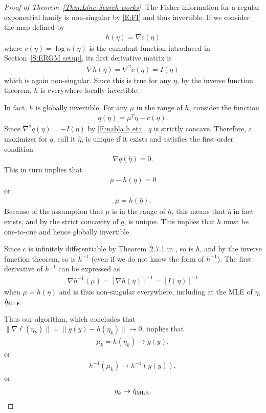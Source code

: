 \begin{proof}[Proof of Theorem~\ref{Thm:Line Search works}]

The Fisher information for a regular exponential family is non-singular by 
\eqref{E:FI} and thus invertible.  If we consider the map defined by
\begin{align*}
	h(\eta) = \nabla c(\eta)
\end{align*}
where $c(\eta) = \log \kappa(\eta)$ is the cumulant function introduced in Section~\ref{S:ERGM setup}, its first derivative matrix is
\begin{align}
	\nabla h(\eta) = \nabla^2 c(\eta) = I(\eta) \label{E:nabla h eta}
\end{align}
which is again non-singular.  Since this is true for any $\eta$, by the inverse 
function theorem, $h$ is everywhere 
locally invertible.

In fact, $h$ is globally invertible. For any $\mu$ in the range of $h$, consider the 
function
\begin{align*}
	q(\eta) = \mu^T\eta - c(\eta).
\end{align*}
Since $\nabla^2 q(\eta) = - I(\eta)$ by \eqref{E:nabla h eta}, $q$ is strictly 
concave.  Therefore, a maximizer for $q$, call it $\hat{\eta}$, is unique if it exists and satisfies the first-order condition
\begin{align*}
	\nabla q( \hat{\eta} ) = 0.
\end{align*}
This in turn implies that
\begin{align*}
	\mu - h(\hat{\eta}) = 0
\end{align*} 
or
\begin{align*}
	\mu = h( \hat{\eta} ). %
\end{align*}
Because of the assumption that $\mu$ is in the range of $h$, this means that 
$\hat{\eta}$ in fact exists, and by the 
strict concavity of $q$, is unique.  This implies that $h$ must be one-to-one and 
hence globally invertible.


Since $c$ is infinitely differentiable by Theorem~2.7.1 in \citet{TSH}, so is $h$, and 
by the inverse function theorem, 
so is $h^{-1}$ (even if we do not know the form of $h^{-1}$).  The first derivative of 
$h^{-1}$ can be expressed as
\begin{align*}
	\nabla h^{-1}(\mu) = \left [ \nabla h(\eta) \right ]^{-1} 
		= \left [ I(\eta) \right ]^{-1}
\end{align*}
when $\mu = h(\eta)$ and is thus non-singular everywhere, including at the MLE of 
$\eta$, $\hat{\eta}_{\textrm{MLE}}$.

Thus our algorithm, which concludes that 
$\lVert \nabla \ell( \eta_k) \rVert  = \lVert g(y) - h(\eta_k) \rVert \to 0$, implies that 
\begin{align*}
	\mu_k = h(\eta_k) \to g(y), 
\end{align*}
or
\begin{align*}
	h^{-1}(\mu_k)  \to h^{-1}\left (g(y) \right),
\end{align*}
or
\begin{align*}
	\eta_k  \to  \hat{\eta}_{\textrm{MLE}}.
\end{align*}

\end{proof}



